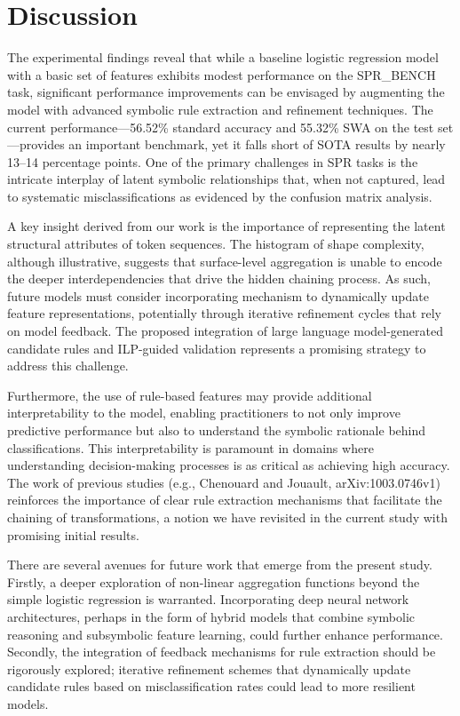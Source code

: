 \documentclass{article}
\begin{document}
\section{Discussion}
The experimental findings reveal that while a baseline logistic regression model with a basic set of features exhibits modest performance on the SPR\_BENCH task, significant performance improvements can be envisaged by augmenting the model with advanced symbolic rule extraction and refinement techniques. The current performance—56.52\% standard accuracy and 55.32\% SWA on the test set—provides an important benchmark, yet it falls short of SOTA results by nearly 13--14 percentage points. One of the primary challenges in SPR tasks is the intricate interplay of latent symbolic relationships that, when not captured, lead to systematic misclassifications as evidenced by the confusion matrix analysis.

A key insight derived from our work is the importance of representing the latent structural attributes of token sequences. The histogram of shape complexity, although illustrative, suggests that surface-level aggregation is unable to encode the deeper interdependencies that drive the hidden chaining process. As such, future models must consider incorporating mechanism to dynamically update feature representations, potentially through iterative refinement cycles that rely on model feedback. The proposed integration of large language model-generated candidate rules and ILP-guided validation represents a promising strategy to address this challenge.

Furthermore, the use of rule-based features may provide additional interpretability to the model, enabling practitioners to not only improve predictive performance but also to understand the symbolic rationale behind classifications. This interpretability is paramount in domains where understanding decision-making processes is as critical as achieving high accuracy. The work of previous studies (e.g., Chenouard and Jouault, arXiv:1003.0746v1) reinforces the importance of clear rule extraction mechanisms that facilitate the chaining of transformations, a notion we have revisited in the current study with promising initial results.

There are several avenues for future work that emerge from the present study. Firstly, a deeper exploration of non-linear aggregation functions beyond the simple logistic regression is warranted. Incorporating deep neural network architectures, perhaps in the form of hybrid models that combine symbolic reasoning and subsymbolic feature learning, could further enhance performance. Secondly, the integration of feedback mechanisms for rule extraction should be rigorously explored; iterative refinement schemes that dynamically update candidate rules based on misclassification rates could lead to more resilient models.
\end{document}
